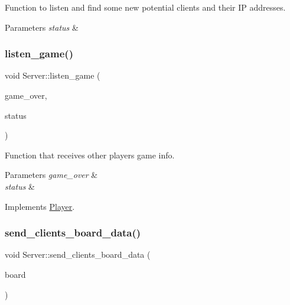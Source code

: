 Function to listen and find some new potential clients and their IP addresses. 


\begin{DoxyParams}{Parameters}
{\em status} & \\
\hline
\end{DoxyParams}
\mbox{\label{classServer_aff65d0adf4570f2b1ffca2d961191901}} 
\subsubsection{\texorpdfstring{listen\+\_\+game()}{listen\_game()}}
{\footnotesize\ttfamily void Server\+::listen\+\_\+game (\begin{DoxyParamCaption}\item[{\hyperlink{classBoard}{Board} \&}]{game\+\_\+over,  }\item[{request\+\_\+status \&}]{status }\end{DoxyParamCaption})\hspace{0.3cm}{\ttfamily [virtual]}}



Function that receives other players\textquotesingle{} game info. 


\begin{DoxyParams}{Parameters}
{\em game\+\_\+over} & \\
\hline
{\em status} & \\
\hline
\end{DoxyParams}


Implements \hyperlink{classPlayer_a24a94f532e7ea75b3429795e34902a94}{Player}.

\mbox{\label{classServer_a3515fb61ca9272c111bd62f4f78e792a}} 
\subsubsection{\texorpdfstring{send\+\_\+clients\+\_\+board\+\_\+data()}{send\_clients\_board\_data()}}
{\footnotesize\ttfamily void Server\+::send\+\_\+clients\+\_\+board\+\_\+data (\begin{DoxyParamCaption}\item[{\hyperlink{classBoard}{Board} \&}]{board }\end{DoxyParamCaption})}



